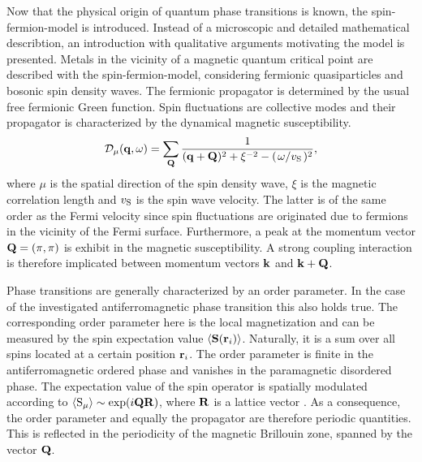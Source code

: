 Now that the physical origin of quantum phase transitions is known, the spin-fermion-model is introduced.
Instead of a microscopic and detailed mathematical describtion, an introduction with qualitative arguments motivating the model is presented.
Metals in the vicinity of a magnetic quantum critical point are described with the spin-fermion-model, considering fermionic quasiparticles and bosonic spin density waves.
The fermionic propagator is determined by the usual free fermionic Green function.
Spin fluctuations are collective modes and their propagator is characterized by the dynamical magnetic susceptibility.
%
\begin{align}
	\mathcal{D}_{\mu}(\vb{q}, \omega) = \sum\limits_{\vb{Q}} \frac{1}{(\vb{q}+\vb{Q})^{2} + \xi^{-2} - (\flatfrac{\omega}{v_{\mt{S}}})^{2}},
	\label{eq:undamped spin propagator}
\end{align}
%
where $\mu$ is the spatial direction of the spin density wave, $\xi$ is the magnetic correlation length and $v_{\mathrm{S}}$ is the spin wave velocity.
The latter is of the same order as the Fermi velocity since spin fluctuations are originated due to fermions in the vicinity of the Fermi surface.
Furthermore, a peak at the momentum vector $\vb{Q} = (\pi, \pi)$ is exhibit in the magnetic susceptibility.
A strong coupling interaction is therefore implicated between momentum vectors $\vb{k}$ and $\vb{k} + \vb{Q}$.

Phase transitions are generally characterized by an order parameter. 
In the case of the investigated antiferromagnetic phase transition this also holds true.
The corresponding order parameter here is the local magnetization and can be measured by the spin expectation value $\expval{\vb{S}(\vb{r}_{i})}$.
Naturally, it is a sum over all spins located at a certain position $\vb{r}_{i}$.
The order parameter is finite in the antiferromagnetic ordered phase and vanishes in the paramagnetic disordered phase.
The expectation value of the spin operator is spatially modulated according to $\expval{\mathrm{S}_{\mu}} \sim \exp({i\vb{Q}\vb{R}})$, where $\vb{R}$ is a lattice vector \cite{Weiss}. 
As a consequence, the order parameter and equally the propagator are therefore periodic quantities.
This is reflected in the periodicity of the magnetic Brillouin zone, spanned by the vector $\vb{Q}$.

